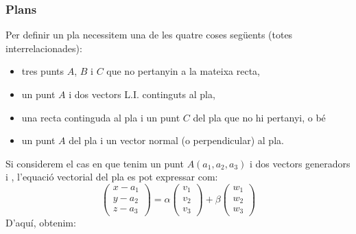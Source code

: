 \documentclass{beamer}
\begin{document}

\begin{frame}[allowframebreaks]
  \frametitle{Plans}
  Per definir un pla necessitem una de les quatre coses següents (totes interrelacionades):
  \begin{itemize}
    \item tres punts $A$, $B$ i $C$ que no pertanyin a la mateixa recta,
    \item un punt $A$ i dos vectors L.I. continguts al pla,
    \item una recta continguda al pla i un punt $C$ del pla que no hi pertanyi, o bé
    \item un punt $A$ del pla i un vector normal (o perpendicular) al pla.
  \end{itemize}
  Si considerem el cas en que tenim un punt $A(a_1,a_2,a_3)$ i dos vectors generadors  i , l'equació vectorial del pla es pot expressar com:
  \[
    \begin{pmatrix}x-a_1\\y-a_2\\z-a_3\end{pmatrix}=
    \alpha
    \begin{pmatrix}v_1\\v_2\\v_3\end{pmatrix}+
    \beta
    \begin{pmatrix}w_1\\w_2\\w_3\end{pmatrix}
  \]
  D'aquí, obtenim:

\end{frame}
\end{document}
